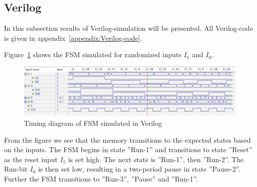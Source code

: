 \begin{table}[H]
\centering
\caption{Static Power Consumption}
\label{tab:power}
\end{table}

\subsection{Verilog}

In this subsection results of Verilog-simulation will be presented. All Verilog-code is given in appendix~\ref{appendix:Verilog-code}.

Figure~\ref{fig:fsm_simulation} shows the FSM simulated for randomized inputs $I_1$ and $I_0$.

\begin{figure}[H]
    \centering
    \includegraphics[width=\textwidth]{Figures/Test of FSM.png}
    \caption{Timing diagram of FSM simulated in Verilog}
    \label{fig:fsm_simulation}
\end{figure}

From the figure we see that the memory transitions to the expected states based on the inputs. The FSM begins in state ''Run-1'' and transitions to state ''Reset'' as the reset input $I_1$ is set high. The next state is ''Run-1'', then ''Run-2''. The Run-bit $I_0$ is then set low, resulting in a two-period pause in state ''Pause-2''. Further the FSM transitions to ''Run-3'', ''Pause'' and ''Run-1''.

